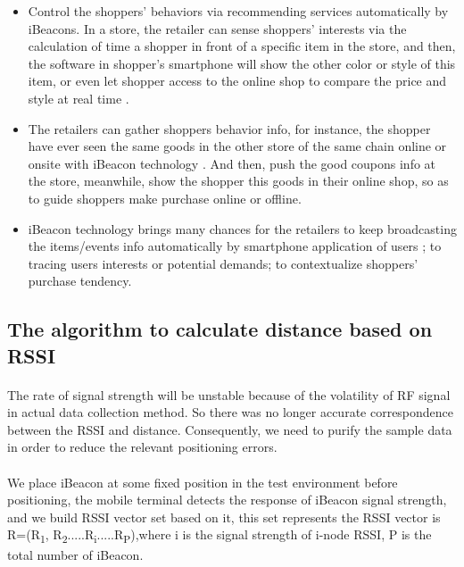 \documentclass[12pt]{article}
\begin{document}
\begin{itemize}
	\item Control the shoppers’ behaviors via recommending services automatically by iBeacons. In a store, the retailer can sense shoppers’ interests via the calculation of time a shopper in front of a specific item in the store, and then, the software in shopper’s smartphone will show the other color or style of this item, or even let shopper access to the online shop to compare the price and style at real time \cite{beacons}.

\item The retailers can gather shoppers behavior info, for instance, the shopper have ever seen the same goods in the other store of the same chain online or onsite with iBeacon technology \cite{beacons}. And then, push the good coupons info at the store, meanwhile, show the shopper this goods in their online shop, so as to guide shoppers make purchase online or offline.

\item iBeacon technology brings many chances for the retailers to keep broadcasting the items/events info automatically by smartphone application of users \cite{beacons}; to tracing users interests or potential demands; to contextualize shoppers’ purchase tendency.

\end{itemize}

\subsection{The algorithm to calculate distance based on RSSI}
\paragraph{}The rate of signal strength will be unstable because of the volatility of RF signal in actual data collection method. So there was no longer accurate correspondence between the RSSI and distance. Consequently, we need to purify the sample data in order to reduce the relevant positioning errors.

\paragraph{}We place iBeacon at some fixed position in the test environment before positioning, the mobile terminal detects the response of iBeacon signal strength, and we build RSSI vector set based on it, this set represents the RSSI vector is R=(R\textsubscript{1}, R\textsubscript{2}.....R\textsubscript{i}.....R\textsubscript{P}),where i is the signal strength of i-node RSSI, P is the total number of iBeacon.
\end{document}
